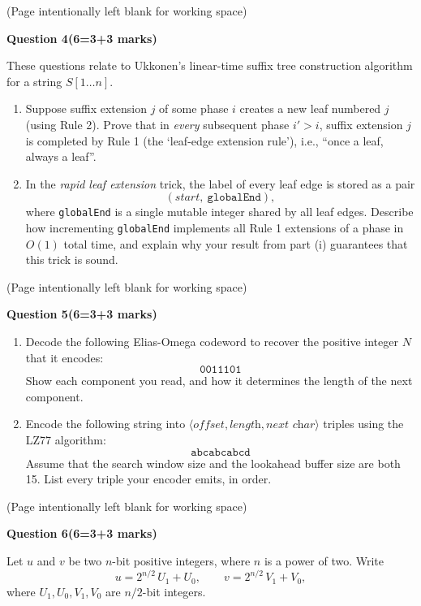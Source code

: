\documentclass[12pt,letterpaper]{article}
\newcommand{\marksbox}[1]{%
  \vfill
  \begin{flushright}
    \fbox{\parbox[c][1.1cm][c]{1.3cm}{\centering #1}}
  \end{flushright}
}
\newcommand{\questiontitle}[2]{%
  \textbf{Question #1}\hfill\textbf{(#2 marks)}
}
\newcommand{\workingpage}{%
  \newpage
  \begin{center}
    (Page intentionally left blank for working space)
  \end{center}
}
\begin{document}
\marksbox{6}

\workingpage
\newpage

\questiontitle{4}{6=3+3}

These questions relate to Ukkonen's linear-time suffix tree construction
algorithm for a string $S[1 \ldots n]$.

\begin{enumerate}
  \item[(i)] Suppose suffix extension $j$ of some phase $i$ creates a new leaf
  numbered $j$ (using Rule 2). Prove that in \emph{every} subsequent phase
  $i' > i$, suffix extension $j$ is completed by Rule 1 (the `leaf-edge
  extension rule'), i.e., ``once a leaf, always a leaf''.

  \item[(ii)] In the \emph{rapid leaf extension} trick, the label of every
  leaf edge is stored as a pair
  \[
    (start,\ \texttt{globalEnd}),
  \]
  where \texttt{globalEnd} is a single mutable integer shared by all leaf
  edges. Describe how incrementing \texttt{globalEnd} implements all Rule 1
  extensions of a phase in $O(1)$ total time, and explain why your result
  from part (i) guarantees that this trick is sound.
\end{enumerate}

\marksbox{6}

\workingpage
\newpage

\questiontitle{5}{6=3+3}

\begin{enumerate}
  \item[(i)] Decode the following Elias-Omega codeword to recover the positive
  integer $N$ that it encodes:
  \[
    \texttt{0011101}
  \]
  Show each component you read, and how it determines the length of the next
  component.

  \item[(ii)] Encode the following string into
  $\langle \textit{offset}, \textit{length}, \textit{next char} \rangle$
  triples using the LZ77 algorithm:
  \[
    \texttt{abcabcabcd}
  \]
  Assume that the search window size and the lookahead buffer size are both
  15. List every triple your encoder emits, in order.
\end{enumerate}

\marksbox{6}

\workingpage
\newpage

\questiontitle{6}{6=3+3}

Let $u$ and $v$ be two $n$-bit positive integers, where $n$ is a power of two.
Write
\[
  u = 2^{n/2}\,U_1 + U_0, \qquad v = 2^{n/2}\,V_1 + V_0,
\]
where $U_1, U_0, V_1, V_0$ are $n/2$-bit integers.
\end{document}
